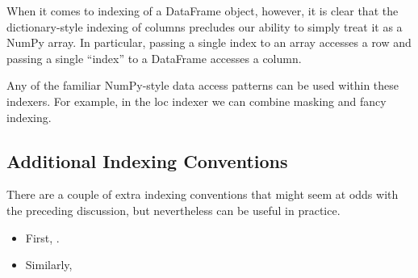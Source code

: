 When it comes to indexing of a DataFrame object, however, it is clear that the
dictionary-style indexing of columns precludes our ability to simply treat it as a
NumPy array. In particular, passing a single index to an array accesses a row and passing a single “index” to a DataFrame accesses a column.

Any of the familiar NumPy-style data access patterns can be used within these indexers. For example, in the loc indexer we can combine masking and fancy indexing.

\subsection*{Additional Indexing Conventions}
There are a couple of extra indexing conventions that might seem at odds with the
preceding discussion, but nevertheless can be useful in practice.

\begin{itemize}
    \item First, .
    \item Similarly, 
\end{itemize}
